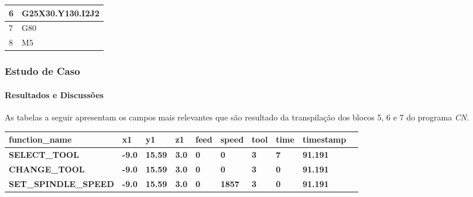 \documentclass[aspectratio=169]{beamer}
\begin{document}
{\begin{frame}[fragile]
\begin{tabular}{l|l}
    \scriptsize{6} & \scriptsize{G25X30.Y130.I2J2} \\
    \hline

    \scriptsize{7} & \scriptsize{G80} \\
    \hline

    \scriptsize{8} & \scriptsize{M5} \\
    \hline
      
  \end{tabular}

\end{frame}  


\begin{frame}[fragile]
  \frametitle{Estudo de Caso}
  \framesubtitle{Resultados e Discussões}

  As tabelas a seguir apresentam os campos mais relevantes que são 
  resultado da transpilação dos blocos 5, 6 e 7 do programa \emph{CN}.

  \vspace{3mm}

  \begin{tabular}{|l|l|l|l|l|l|l|l|l|l|}

    \hline

    \tiny{\bfseries{function\_name}} & 
    \tiny{\bfseries{x1}} & 
    \tiny{\bfseries{y1}} & 
    \tiny{\bfseries{z1}} & 
    \tiny{\bfseries{feed}} & 
    \tiny{\bfseries{speed}} & 
    \tiny{\bfseries{tool}} & 
    \tiny{\bfseries{time}} & 
    \tiny{\bfseries{timestamp}} \\
    \hline

    \tiny{\bfseries{SELECT\_TOOL}} & 
    \tiny{\bfseries{-9.0}} & 
    \tiny{\bfseries{15.59}} & 
    \tiny{\bfseries{3.0}} & 
    \tiny{\bfseries{0}} & 
    \tiny{\bfseries{0}} & 
    \tiny{\bfseries{3}} & 
    \tiny{\bfseries{7}} & 
    \tiny{\bfseries{91.191}} \\    
    \hline

    \tiny{\bfseries{CHANGE\_TOOL}} & 
    \tiny{\bfseries{-9.0}} & 
    \tiny{\bfseries{15.59}} & 
    \tiny{\bfseries{3.0}} & 
    \tiny{\bfseries{0}} & 
    \tiny{\bfseries{0}} & 
    \tiny{\bfseries{3}} & 
    \tiny{\bfseries{0}} & 
    \tiny{\bfseries{91.191}} \\
    \hline

    \tiny{\bfseries{SET\_SPINDLE\_SPEED}} & 
    \tiny{\bfseries{-9.0}} & 
    \tiny{\bfseries{15.59}} & 
    \tiny{\bfseries{3.0}} & 
    \tiny{\bfseries{0}} & 
    \tiny{\bfseries{1857}} & 
    \tiny{\bfseries{3}} & 
    \tiny{\bfseries{0}} & 
    \tiny{\bfseries{91.191}} \\
    \hline


\end{tabular}
\end{frame}}
\end{document}

